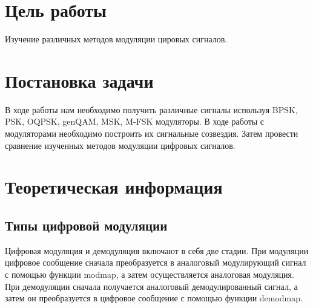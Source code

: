 

\setcounter{tocdepth}{3}






 
\section{Цель работы}
Изучение различных методов модуляции цировых сигналов.
 
\section{Постановка задачи}
В ходе работы нам необходимо получить различные сигналы используя BPSK, PSK, OQPSK, genQAM, MSK, M-FSK модуляторы. В ходе работы с модуляторами необходимо построить их сигнальные созвездия. Затем провести сравнение изученных методов модуляции цифровых сигналов.



\section{Теоретическая информация}

\subsection{Типы цифровой модуляции}

Цифровая модуляция и демодуляция включают в себя две стадии. При модуляции цифровое сообщение сначала преобразуется в аналоговый модулирующий сигнал с помощью функции modmap, а затем осуществляется аналоговая модуляция. При демодуляции сначала получается аналоговый демодулированный сигнал, а затем он преобразуется в цифровое сообщение с помощью функции demodmap.
 
